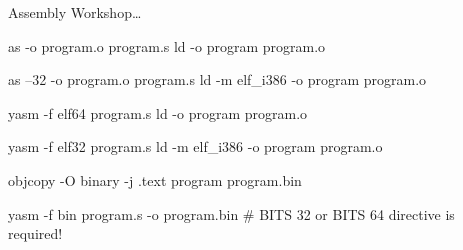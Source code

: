 \begin{slide}{Assembly Workshop\dots}{}
  \begin{nicscolumn*}{1cm}{1.7cm}{14cm}
  \end{nicscolumn*}
  \begin{nicscolumn*}{1.5cm}{2.5cm}{5cm}
    \SMALL{}
    \begin{nicsterm}
      as -o program.o program.s
      ld -o program program.o
    \end{nicsterm}
  \end{nicscolumn*}
  \begin{nicscolumn*}{7cm}{2.5cm}{5cm}
    \SMALL{}
    \begin{nicsterm}
      as --32 -o program.o program.s
      ld -m elf_i386 -o program program.o
    \end{nicsterm}
  \end{nicscolumn*}
  \begin{nicscolumn*}{1.5cm}{3.8cm}{5cm}
    \SMALL{}
    \begin{nicsterm}
      yasm -f elf64 program.s
      ld -o program program.o
    \end{nicsterm}
  \end{nicscolumn*}
  \begin{nicscolumn*}{7cm}{3.8cm}{5cm}
    \SMALL{}
    \begin{nicsterm}
      yasm -f elf32 program.s
      ld -m elf_i386 -o program program.o
    \end{nicsterm}
  \end{nicscolumn*}
  \begin{nicscolumn*}{1cm}{5.2cm}{14cm}
  \end{nicscolumn*}
  \begin{nicscolumn*}{1.5cm}{6cm}{10cm}
    \SMALL{}
    \begin{nicsterm}
      objcopy -O binary -j .text program program.bin
    \end{nicsterm}
  \end{nicscolumn*}
  \begin{nicscolumn*}{1.5cm}{6.7cm}{10cm}
    \SMALL{}
    \begin{nicsterm}
      yasm -f bin program.s -o program.bin
      # BITS 32 or BITS 64 directive is required!
    \end{nicsterm}
  \end{nicscolumn*}
\end{slide}



